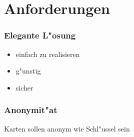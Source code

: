 \section{Anforderungen}
\begin{frame}
	\frametitle{Elegante L"osung}
	\begin{itemize}
		\item einfach zu realisieren
		\item g"unstig
		\item sicher
	\end{itemize}
\end{frame}

\begin{frame}
	\frametitle{Anonymit"at}
	Karten sollen anonym wie Schl"ussel sein
\end{frame}
